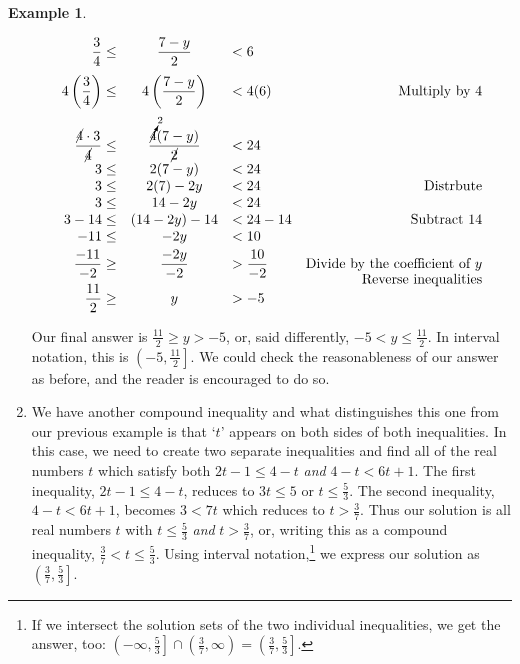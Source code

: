 \documentclass[11pt]{article}
\theoremstyle{definition}  %
\newtheorem{ex}{\bf Example}[section]
\begin{document}
\begin{ex}
\begin{enumerate}
\[\begin{array}{rclr}
\dfrac{3}{4} \leq & \dfrac{7-y}{2} & < 6 & \\ [10pt]

4\left(\dfrac{3}{4} \right) \leq & 4\left( \dfrac{7-y}{2}\right) & < 4(6) & \text{Multiply by $4$} \\ [12pt]

\dfrac{\cancel{4} \cdot 3}{\cancel{4}} \leq & \dfrac{\cancelto{2}{4}(7-y)}{\cancel{2}} &  < 24 & \\ [5pt]

3 \leq & 2(7-y) & < 24 & \\

3 \leq & 2(7)-2y & < 24 & \text{Distrbute}\\

3 \leq & 14-2y & < 24 & \\

3 -14 \leq & (14-2y) - 14 & < 24 - 14 & \text{Subtract $14$}\\

-11 \leq & -2y & < 10 & \\ [3pt]

\dfrac{-11}{-2} \geq & \dfrac{-2y}{-2} & > \dfrac{10}{-2} & \text{Divide by the coefficient of $y$} \\ [-5pt]
                     &                 &                  & \text{Reverse inequalities} \\ [-3pt]

\dfrac{11}{2}  \geq & y & > -5 & \\

\end{array} \]

Our final answer is $\frac{11}{2} \geq y > -5$, or, said differently,  $-5 < y \leq \frac{11}{2}$. In interval notation, this is $\left( -5, \frac{11}{2} \right]$.  We could check the reasonableness of our answer as before, and the reader is encouraged to do so.  

\item  We have another compound inequality and what distinguishes this one from our previous example is that `$t$' appears on both sides of both inequalities.  In this case, we need to create two separate inequalities and find all of the real numbers $t$ which satisfy both  $2t-1 \leq 4-t$ \textit{and} $4-t < 6t + 1$.  The first inequality, $2t-1 \leq 4-t$, reduces to $3t \leq 5$ or $t \leq \frac{5}{3}$.  The second inequality, $4-t < 6t+1$, becomes $3 < 7t$  which reduces to $t > \frac{3}{7}$.  Thus our solution is all real numbers $t$ with $t \leq \frac{5}{3}$ \textit{and}  $t > \frac{3}{7}$, or, writing this as a compound inequality,  $\frac{3}{7} < t \leq \frac{5}{3}$. Using interval notation,\footnote{If we intersect the solution sets of the two individual inequalities, we get the answer, too:  $\left(-\infty, \frac{5}{3}\right] \cap \left(\frac{3}{7}, \infty\right) = \left( \frac{3}{7}, \frac{5}{3} \right]$.} we express our solution as $\left( \frac{3}{7}, \frac{5}{3} \right]$.



\end{enumerate}
\end{ex}
\end{document}
